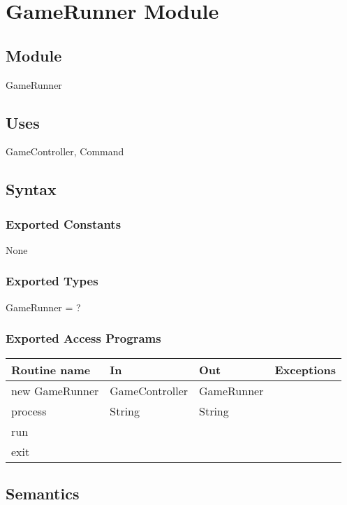 \documentclass[12pt]{article}
\begin{document}
\section* {GameRunner Module}

\subsection*{Module}

GameRunner

\subsection* {Uses}

GameController, Command

\subsection* {Syntax}

\subsubsection* {Exported Constants}

None

\subsubsection* {Exported Types}

GameRunner = ?

\subsubsection* {Exported Access Programs}

\begin{tabular}{| l | l | l | p{5cm} |}
  \hline
  \textbf{Routine name} & \textbf{In} & \textbf{Out} & \textbf{Exceptions}\\
  \hline
  new GameRunner & GameController   & GameRunner & \\
  \hline
  process & String & String & ~\\
  \hline
  run & & & ~\\
  \hline
  exit &&&\\
  \hline
  
\end{tabular}

\subsection* {Semantics}
\end{document}
